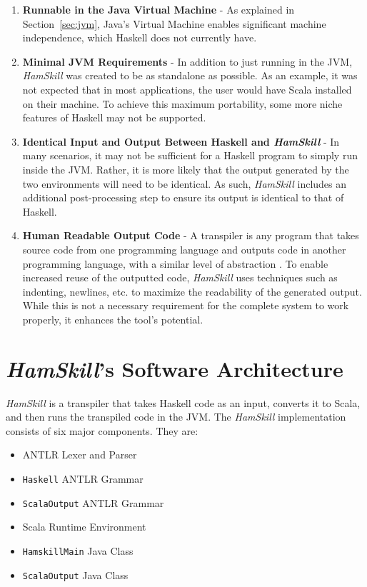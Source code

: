 \documentclass{report}
\begin{document}
\begin{enumerate}

\item \textbf{Runnable in the Java Virtual Machine} - As explained in Section~\ref{sec:jvm}, Java's Virtual Machine enables significant machine independence, which Haskell does not currently have.

\item \textbf{Minimal JVM Requirements} - In addition to just running in the JVM, \textit{HamSkill} was created to be as standalone as possible.  As an example, it was not expected that in most applications, the user would have Scala installed on their machine.  To achieve this maximum portability, some more niche features of Haskell may not be supported.

\item \textbf{Identical Input and Output Between Haskell and \emph{HamSkill}} - In many scenarios, it may not be sufficient for a Haskell program to simply run inside the JVM.  Rather, it is more likely that the output generated by the two environments will need to be identical.  As such, \emph{HamSkill} includes an additional post-processing step to ensure its output is identical to that of Haskell.

\item \textbf{Human Readable Output Code} - A transpiler is any program that takes source code from one programming language and outputs code in another programming language, with a similar level of abstraction \cite{jansen_2015}.  To enable increased reuse of the outputted code, \textit{HamSkill} uses techniques such as indenting, newlines, etc. to maximize the readability of the generated output.  While this is not a necessary requirement for the complete system to work properly, it enhances the tool's potential.

\end{enumerate}

\section{\textit{HamSkill}'s Software Architecture}\label{sec:hamskillSoftwareArchitecture}

\emph{HamSkill} is a transpiler that takes Haskell code as an input, converts it to Scala, and then runs the transpiled code in the JVM.  The \emph{HamSkill} implementation consists of six major components.  They are:

\begin{itemize}
   \item ANTLR Lexer and Parser
   \item \texttt{Haskell} ANTLR Grammar
   \item \texttt{ScalaOutput} ANTLR Grammar
   \item Scala Runtime Environment
   \item \texttt{HamskillMain} Java Class
   \item \texttt{ScalaOutput} Java Class
\end{itemize}
\end{document}
